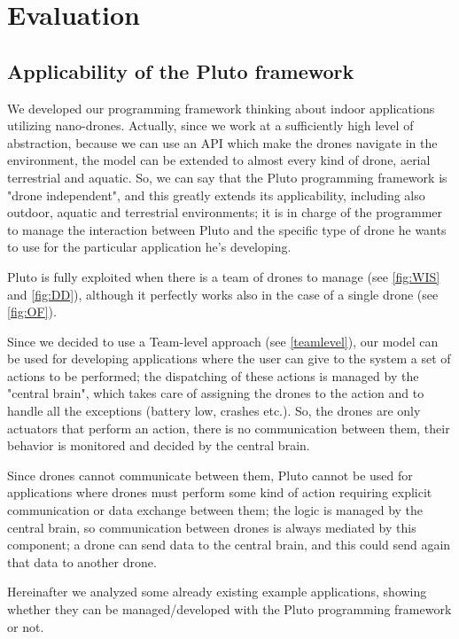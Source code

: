 \chapter{Evaluation}
\label{cap6}


\section{Applicability of the Pluto framework}\label{applicability}


We developed our programming framework thinking about indoor applications utilizing nano-drones.
Actually, since we work at a sufficiently high level of abstraction, because we can use an API which make the drones navigate in the environment, the model can be extended to almost every kind of drone, aerial terrestrial and aquatic.
So, we can say that the Pluto programming framework is "drone independent", and this greatly extends its applicability, including also outdoor, aquatic and terrestrial environments; it is in charge of the programmer to manage the interaction between Pluto and the specific type of drone he wants to use for the particular application he's developing.

Pluto is fully exploited when there is a team of drones to manage (see \ref{fig:WIS} and \ref{fig:DD}), although it perfectly works also in the case of a single drone (see \ref{fig:OF}).

Since we decided to use a Team-level approach (see \ref{teamlevel}), our model can be used for developing applications where the user can give to the system a set of actions to be performed; the dispatching of these actions is managed by the "central brain", which takes care of assigning the drones to the action and to handle all the exceptions (battery low, crashes etc.). So, the drones are only actuators that perform an action, there is no communication between them, their behavior is monitored and decided by the central brain.

Since drones cannot communicate between them, Pluto cannot be used for applications where drones must perform some kind of action requiring explicit communication or data exchange between them; the logic is managed by the central brain, so communication between drones is always mediated by this component; a drone can send data to the central brain, and this could send again that data to another drone.

Hereinafter we analyzed some already existing example applications, showing whether they can be managed/developed with the Pluto programming framework or not.


